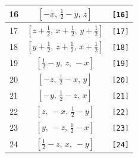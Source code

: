 \documentclass[fleqn,8pt]{jsarticle}
\begin{document}
\begin{longtable}{ccc}
16 & $\left[ - x,\, \frac{1}{2} - y,\, z \right]$ & {\tt [16]} \\ \hline
17 & $\left[ z + \frac{1}{2},\, x + \frac{1}{2},\, y + \frac{1}{2} \right]$ & {\tt [17]} \\ \hline
18 & $\left[ y + \frac{1}{2},\, z + \frac{1}{2},\, x + \frac{1}{2} \right]$ & {\tt [18]} \\ \hline
19 & $\left[ \frac{1}{2} - y,\, z,\, - x \right]$ & {\tt [19]} \\ \hline
20 & $\left[ - z,\, \frac{1}{2} - x,\, y \right]$ & {\tt [20]} \\ \hline
21 & $\left[ - y,\, \frac{1}{2} - z,\, x \right]$ & {\tt [21]} \\ \hline
22 & $\left[ z,\, - x,\, \frac{1}{2} - y \right]$ & {\tt [22]} \\ \hline
23 & $\left[ y,\, - z,\, \frac{1}{2} - x \right]$ & {\tt [23]} \\ \hline
24 & $\left[ \frac{1}{2} - z,\, x,\, - y \right]$ & {\tt [24]} \\
\end{longtable}
\end{document}
